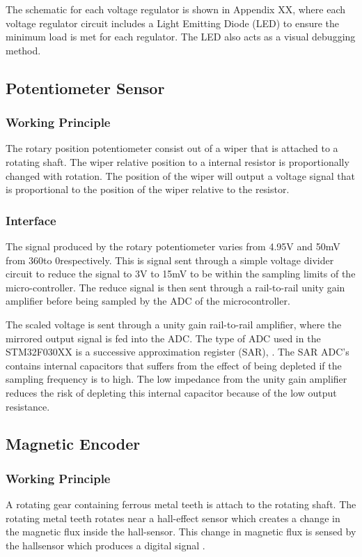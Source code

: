 The schematic for each voltage regulator is shown in Appendix XX, where each voltage regulator circuit includes a Light Emitting Diode (LED) to ensure the minimum load is met for each regulator. The LED also acts as a visual debugging method.

\subsection{Potentiometer Sensor}
\subsubsection{Working Principle}
The rotary position potentiometer consist out of a wiper that is attached to a rotating shaft. The wiper relative position to a internal resistor is proportionally changed with rotation. The position of the wiper will output a voltage signal that is proportional to the position of the wiper relative to the resistor. 

\subsubsection{Interface}
The signal produced by the rotary potentiometer varies from 4.95V and 50mV from 360\textdegree to 0\textdegree respectively. This is signal sent through a simple voltage divider circuit to reduce the signal to 3V to 15mV to be within the sampling limits of the micro-controller. The reduce signal is then sent through a rail-to-rail unity gain amplifier before being sampled by the ADC of the microcontroller.

The scaled voltage is sent through a unity gain rail-to-rail amplifier, where the mirrored output signal is fed into the ADC. The type of ADC used in the STM32F030XX is a successive approximation register (SAR), \citep{stm32_ADC:2017}. The SAR ADC's contains internal capacitors that suffers from the effect of being depleted if the sampling frequency is to high. The low impedance from the unity gain amplifier reduces the risk of depleting this internal capacitor because of the low output resistance.


\subsection{Magnetic Encoder}
\subsubsection{Working Principle}
A rotating gear containing ferrous metal teeth is attach to the rotating shaft. The rotating metal teeth rotates near a hall-effect sensor which creates a change in the magnetic flux inside the hall-sensor. This change in magnetic flux is sensed by the hallsensor which produces a digital signal \citep{hallsensor}.
